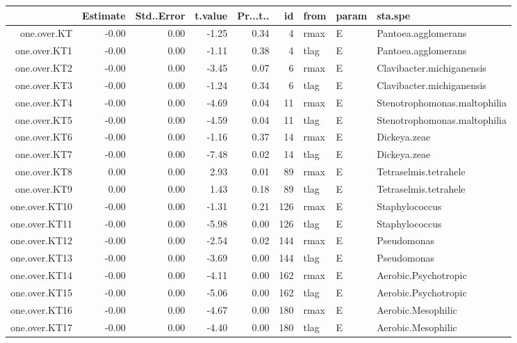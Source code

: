\begin{table}[ht]
\centering
\begin{tabular}{rrrrrrlll}
  \hline
 & Estimate & Std..Error & t.value & Pr...t.. & id & from & param & sta.spe \\ 
  \hline
one.over.KT & -0.00 & 0.00 & -1.25 & 0.34 &   4 & rmax & E & Pantoea.agglomerans \\ 
  one.over.KT1 & -0.00 & 0.00 & -1.11 & 0.38 &   4 & tlag & E & Pantoea.agglomerans \\ 
  one.over.KT2 & -0.00 & 0.00 & -3.45 & 0.07 &   6 & rmax & E & Clavibacter.michiganensis \\ 
  one.over.KT3 & -0.00 & 0.00 & -1.24 & 0.34 &   6 & tlag & E & Clavibacter.michiganensis \\ 
  one.over.KT4 & -0.00 & 0.00 & -4.69 & 0.04 &  11 & rmax & E & Stenotrophomonas.maltophilia \\ 
  one.over.KT5 & -0.00 & 0.00 & -4.59 & 0.04 &  11 & tlag & E & Stenotrophomonas.maltophilia \\ 
  one.over.KT6 & -0.00 & 0.00 & -1.16 & 0.37 &  14 & rmax & E & Dickeya.zeae \\ 
  one.over.KT7 & -0.00 & 0.00 & -7.48 & 0.02 &  14 & tlag & E & Dickeya.zeae \\ 
  one.over.KT8 & 0.00 & 0.00 & 2.93 & 0.01 &  89 & rmax & E & Tetraselmis.tetrahele \\ 
  one.over.KT9 & 0.00 & 0.00 & 1.43 & 0.18 &  89 & tlag & E & Tetraselmis.tetrahele \\ 
  one.over.KT10 & -0.00 & 0.00 & -1.31 & 0.21 & 126 & rmax & E & Staphylococcus \\ 
  one.over.KT11 & -0.00 & 0.00 & -5.98 & 0.00 & 126 & tlag & E & Staphylococcus \\ 
  one.over.KT12 & -0.00 & 0.00 & -2.54 & 0.02 & 144 & rmax & E & Pseudomonas \\ 
  one.over.KT13 & -0.00 & 0.00 & -3.69 & 0.00 & 144 & tlag & E & Pseudomonas \\ 
  one.over.KT14 & -0.00 & 0.00 & -4.11 & 0.00 & 162 & rmax & E & Aerobic.Psychotropic \\ 
  one.over.KT15 & -0.00 & 0.00 & -5.06 & 0.00 & 162 & tlag & E & Aerobic.Psychotropic \\ 
  one.over.KT16 & -0.00 & 0.00 & -4.67 & 0.00 & 180 & rmax & E & Aerobic.Mesophilic \\ 
  one.over.KT17 & -0.00 & 0.00 & -4.40 & 0.00 & 180 & tlag & E & Aerobic.Mesophilic \\ 

\end{tabular}
\end{table}
